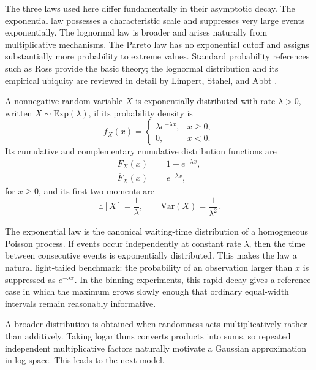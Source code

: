 The three laws used here differ fundamentally in their asymptotic decay. The exponential law possesses a characteristic scale and suppresses very large events exponentially. The lognormal law is broader and arises naturally from multiplicative mechanisms. The Pareto law has no exponential cutoff and assigns substantially more probability to extreme values. Standard probability references such as Ross \cite{Ross2014} provide the basic theory; the lognormal distribution and its empirical ubiquity are reviewed in detail by Limpert, Stahel, and Abbt \cite{LimpertStahelAbbt2001}.

\begin{definition}
A nonnegative random variable $X$ is exponentially distributed with rate $\lambda>0$, written $X\sim\mathrm{Exp}(\lambda)$, if its probability density is
\begin{equation}
 f_X(x)=
 \begin{cases}
 \lambda e^{-\lambda x}, & x\geq 0,\\
 0, & x<0.
 \end{cases}
\end{equation}
Its cumulative and complementary cumulative distribution functions are
\begin{align}
 F_X(x) &= 1-e^{-\lambda x},\\
 \overline F_X(x) &= e^{-\lambda x},
\end{align}
for $x\geq 0$, and its first two moments are
\begin{equation}
 \mathbb{E}[X]=\frac{1}{\lambda},
 \qquad
 \mathrm{Var}(X)=\frac{1}{\lambda^2}.
\end{equation}
\end{definition}

The exponential law is the canonical waiting-time distribution of a homogeneous Poisson process. If events occur independently at constant rate $\lambda$, then the time between consecutive events is exponentially distributed. This makes the law a natural light-tailed benchmark: the probability of an observation larger than $x$ is suppressed as $e^{-\lambda x}$. In the binning experiments, this rapid decay gives a reference case in which the maximum grows slowly enough that ordinary equal-width intervals remain reasonably informative.

A broader distribution is obtained when randomness acts multiplicatively rather than additively. Taking logarithms converts products into sums, so repeated independent multiplicative factors naturally motivate a Gaussian approximation in log space. This leads to the next model.


